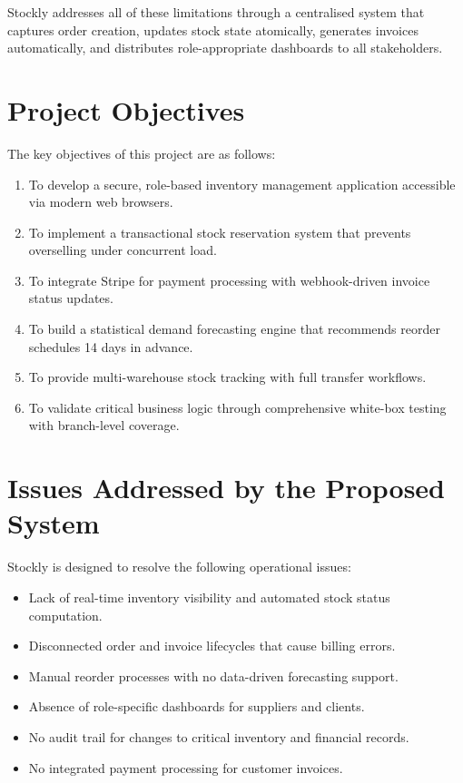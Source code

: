 \documentclass[12pt,a4paper]{report}
\begin{document}
Stockly addresses all of these limitations through a centralised system that captures order creation, updates stock state atomically, generates invoices automatically, and distributes role-appropriate dashboards to all stakeholders.

\section{Project Objectives}

The key objectives of this project are as follows:
\begin{enumerate}
    \item To develop a secure, role-based inventory management application accessible via modern web browsers.
    \item To implement a transactional stock reservation system that prevents overselling under concurrent load.
    \item To integrate Stripe for payment processing with webhook-driven invoice status updates.
    \item To build a statistical demand forecasting engine that recommends reorder schedules 14 days in advance.
    \item To provide multi-warehouse stock tracking with full transfer workflows.
    \item To validate critical business logic through comprehensive white-box testing with branch-level coverage.
\end{enumerate}

\section{Issues Addressed by the Proposed System}

Stockly is designed to resolve the following operational issues:
\begin{itemize}
    \item Lack of real-time inventory visibility and automated stock status computation.
    \item Disconnected order and invoice lifecycles that cause billing errors.
    \item Manual reorder processes with no data-driven forecasting support.
    \item Absence of role-specific dashboards for suppliers and clients.
    \item No audit trail for changes to critical inventory and financial records.
    \item No integrated payment processing for customer invoices.
\end{itemize}
\end{document}
